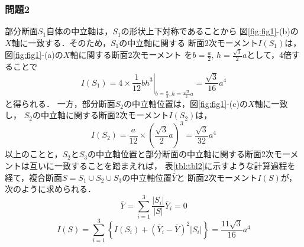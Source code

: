 \documentclass[10pt,a4j]{jarticle}
\begin{document}
\subsubsection*{問題2}
部分断面$S_1$自体の中立軸は，$S_1$の形状上下対称であることから
図\ref{fig:fig1}-(b)の$X$軸に一致する．そのため，$S_1$の中立軸に関する
断面2次モーメント$I(S_1)$は，図\ref{fig:fig1}-(a)の$X$軸に関する断面2次モーメント
を$b=\frac{a}{2},\,h=\frac{\sqrt{3}}{2}a$として，4倍することで
\begin{equation}
	I(S_1) =  4\times \left. \frac{1}{12}bh^3 \right|_{b=\frac{a}{2},h=\frac{\sqrt{3}}{2}a}=\frac{\sqrt{3}}{16}a^4
	\label{eqn:eq_lbl}
\end{equation}
と得られる．
一方，部分断面$S_2$の中立軸位置は，図\ref{fig:fig1}-(c)の$X$軸に一致し，
$S_2$の中立軸に関する断面2次モーメント$I(S_2)$は，
\begin{equation}
	I(S_2)= 
		\frac{a}{12} \times \left( \frac{\sqrt{3}}{2}a \right)^3=\frac{\sqrt{3}}{32}a^4
	\label{eqn:eq_lbl}
\end{equation}
以上のことと，$S_2$と$S_3$の中立軸位置と部分断面の中立軸に関する断面2次モーメントは互いに一致することを踏まえれば，
表\ref{tbl:tbl2}に示すような計算過程を経て，複合断面$S=S_1\cup S_2 \cup S_3$の中立軸位置$\bar Y$と
断面2次モーメント$I(S)$が，次のように求められる．
\begin{equation}
	\bar Y = \sum_{i=1}^3 \frac{\left|S_i\right|}{\left| S \right|}\bar{Y}_i=0
	\label{eqn:Yb2}
\end{equation}
\begin{equation}
	I(S)=\sum_{i=1}^3\left\{
		I(S_i)+\left( \bar Y_i -\bar Y\right)^2\left| S_i \right|
	\right\}
		=\frac{11\sqrt{3}}{16}a^4
	\label{eqn:Iz_2}
\end{equation}
\end{document}
